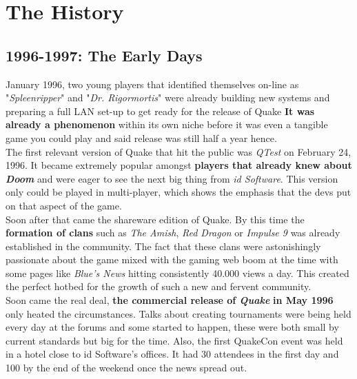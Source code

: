\section{The History}
\label{sec::history}

\subsection{1996-1997: The Early Days}

January 1996, two young players that identified themselves on-line as "\textit{Spleenripper}" and "\textit{Dr. Rigormortis}" were already building new systems and preparing a full LAN set-up to get ready for the release of Quake \citep{clanHistory} \textbf{It was already a phenomenon} within its own niche before it was even a tangible game you could play and said release was still half a year hence.\\


The first relevant version of Quake that hit the public was \textit{QTest} \citep{qtest} on February 24, 1996. It became extremely popular amongst \textbf{players that already knew about \textit{Doom}} \citep{game:doom} and were eager to see the next big thing from \textit{id Software}. This version only could be played in multi-player, which shows the emphasis that the devs put on that aspect of the game.\\

Soon after that came the shareware edition of Quake. By this time the \textbf{formation of clans} such as \textit{The Amish}, \textit{Red Dragon} or \textit{Impulse 9} was already established in the community. The fact that these clans were astonishingly passionate about the game mixed with the gaming web boom at the time with some pages like \textit{Blue's News} hitting consistently 40.000 views a day. This created the perfect hotbed for the growth of such a new and fervent community.\\

Soon came the real deal, \textbf{the commercial release of \textit{Quake}} \citep{game:quake1} \textbf{in May 1996} only heated the circumstances. Talks about creating tournaments were being held every day at the forums and some started to happen, these were both small by current standards but big for the time. Also, the first QuakeCon \citep{quakecon} event was held in a hotel close to id Software's offices. It had 30 attendees in the first day and 100 by the end of the weekend once the news spread out.\\

